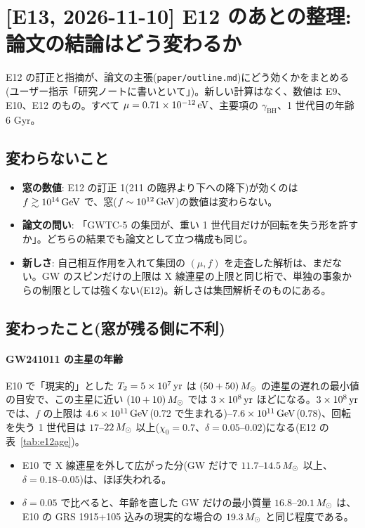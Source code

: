 \section{[E13, 2026-11-10] E12 のあとの整理: 論文の結論はどう変わるか}\label{sec:e13}

E12 の訂正と指摘が、論文の主張(\texttt{paper/outline.md})にどう効くかをまとめる(ユーザー指示「研究ノートに書いといて」)。新しい計算はなく、数値は E9、E10、E12 のもの。すべて $\mu=0.71\times10^{-12}\,\mathrm{eV}$、主要項の $\gamma_\mathrm{BH}$、1 世代目の年齢 6 Gyr。

\subsection{変わらないこと}

\begin{itemize}
\item \textbf{窓の数値}: E12 の訂正 1(211 の臨界より下への降下)が効くのは $f\gtrsim10^{14}\,\mathrm{GeV}$ で、窓($f\sim10^{12}\,\mathrm{GeV}$)の数値は変わらない。
\item \textbf{論文の問い}: 「GWTC-5 の集団が、重い 1 世代目だけが回転を失う形を許すか」。どちらの結果でも論文として立つ構成も同じ。
\item \textbf{新しさ}: 自己相互作用を入れて集団の $(\mu,f)$ を走査した解析は、まだない。GW のスピンだけの上限は X 線連星の上限と同じ桁で、単独の事象からの制限としては強くない(E12)。新しさは集団解析そのものにある。
\end{itemize}

\subsection{変わったこと(窓が残る側に不利)}

\paragraph{GW241011 の主星の年齢}
E10 で「現実的」とした $T_2=5\times10^7\,\mathrm{yr}$ は $(50+50)\,M_\odot$ の連星の遅れの最小値の目安で、この主星に近い $(10+10)\,M_\odot$ では $3\times10^8\,\mathrm{yr}$ ほどになる。$3\times10^8\,\mathrm{yr}$ では、$f$ の上限は $4.6\times10^{11}\,\mathrm{GeV}$(0.72 で生まれる)--$7.6\times10^{11}\,\mathrm{GeV}$(0.78)、回転を失う 1 世代目は $17$--$22\,M_\odot$ 以上($\chi_0=0.7$、$\delta=0.05$--$0.02$)になる(E12 の表~\ref{tab:e12age})。
\begin{itemize}
\item E10 で X 線連星を外して広がった分(GW だけで $11.7$--$14.5\,M_\odot$ 以上、$\delta=0.18$--$0.05$)は、ほぼ失われる。
\item $\delta=0.05$ で比べると、年齢を直した GW だけの最小質量 $16.8$--$20.1\,M_\odot$ は、E10 の GRS 1915+105 込みの現実的な場合の $19.3\,M_\odot$ と同じ程度である。
\end{itemize}

